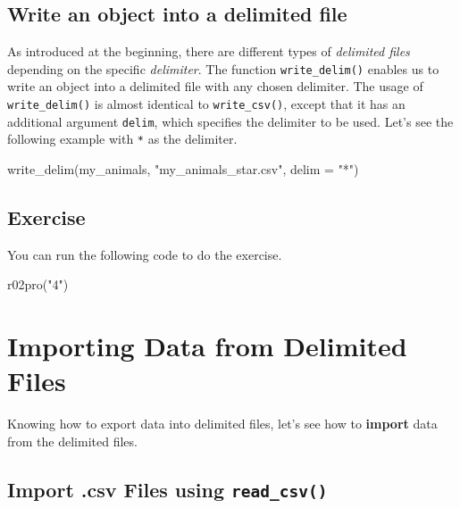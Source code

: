 \documentclass[
]{book}
\newenvironment{Shaded}{\begin{snugshade}}{\end{snugshade}}
\newcommand{\AttributeTok}[1]{\textcolor[rgb]{0.77,0.63,0.00}{#1}}
\newcommand{\FunctionTok}[1]{\textcolor[rgb]{0.00,0.00,0.00}{#1}}
\newcommand{\NormalTok}[1]{#1}
\newcommand{\StringTok}[1]{\textcolor[rgb]{0.31,0.60,0.02}{#1}}
\begin{document}
\hypertarget{write-an-object-into-a-delimited-file}{%
\subsection{Write an object into a delimited file}\label{write-an-object-into-a-delimited-file}}

As introduced at the beginning, there are different types of \emph{delimited files} depending on the specific \emph{delimiter}. The function \texttt{write\_delim()} enables us to write an object into a delimited file with any chosen delimiter. The usage of \texttt{write\_delim()} is almost identical to \texttt{write\_csv()}, except that it has an additional argument \texttt{delim}, which specifies the delimiter to be used. Let's see the following example with \texttt{*} as the delimiter.

\begin{Shaded}
\begin{Highlighting}[]
\FunctionTok{write\_delim}\NormalTok{(my\_animals, }\StringTok{"my\_animals\_star.csv"}\NormalTok{, }\AttributeTok{delim =} \StringTok{"*"}\NormalTok{)}
\end{Highlighting}
\end{Shaded}

\hypertarget{exercise-6}{%
\subsection{Exercise}\label{exercise-6}}

You can run the following code to do the exercise.

\begin{Shaded}
\begin{Highlighting}[]
\FunctionTok{r02pro}\NormalTok{(}\StringTok{"4"}\NormalTok{)}
\end{Highlighting}
\end{Shaded}

\hypertarget{import-data}{%
\section{Importing Data from Delimited Files}\label{import-data}}

Knowing how to export data into delimited files, let's see how to \textbf{import} data from the delimited files.

\hypertarget{import-.csv-files-using-read_csv}{%
\subsection{\texorpdfstring{Import .csv Files using \texttt{read\_csv()}}{Import .csv Files using read\_csv()}}\label{import-.csv-files-using-read_csv}}
\end{document}
